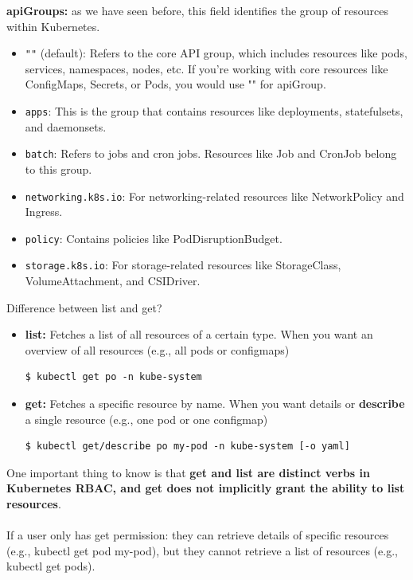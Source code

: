 \documentclass{article}
\newenvironment{blocktemplate}[1]{%
    \tcolorbox[beamer,%
    noparskip,breakable,
    colframe=Blue,%
    colbacklower=LimeGreen!75!LightGreen,%
    title=#1]}%
    {\endtcolorbox}
\newenvironment{codetemplate}[1][]{%
  \mybasecolorbox[#1]
  \itshape
}{%
  \endmybasecolorbox
}
\begin{document}
\textbf{apiGroups:} as we have seen before, this field identifies the group of resources within Kubernetes.
\begin{itemize}
    \item \verb|""| (default): Refers to the core API group, which includes resources like pods, services, namespaces, nodes, etc. If you're working with core resources like ConfigMaps, Secrets, or Pods, you would use "" for apiGroup.
    \item \verb|apps|: This is the group that contains resources like deployments, statefulsets, and daemonsets.
    \item \verb|batch|: Refers to jobs and cron jobs. Resources like Job and CronJob belong to this group.
    \item \verb|networking.k8s.io|: For networking-related resources like NetworkPolicy and Ingress.
    \item \verb|policy|: Contains policies like PodDisruptionBudget.
    \item \verb|storage.k8s.io|: For storage-related resources like StorageClass, VolumeAttachment, and CSIDriver.
\end{itemize}

\begin{blocktemplate}{NOTE}
Difference between list and get?
\begin{itemize}
    \item \textbf{list:} Fetches a list of all resources of a certain type. When you want an overview of all resources (e.g., all pods or configmaps)
\begin{codetemplate}{}
\begin{verbatim}
$ kubectl get po -n kube-system
\end{verbatim}
\end{codetemplate}
    \item \textbf{get:} Fetches a specific resource by name. When you want details or \textbf{describe} a single resource (e.g., one pod or one configmap)
\begin{codetemplate}{}
\begin{verbatim}
$ kubectl get/describe po my-pod -n kube-system [-o yaml]
\end{verbatim}
\end{codetemplate}
\end{itemize}

One important thing to know is that \textbf{get and list are distinct verbs in Kubernetes RBAC, and get does not implicitly grant the ability to list resources}.
\\\\
If a user only has get permission: they can retrieve details of specific resources (e.g., kubectl get pod my-pod), but they cannot retrieve a list of resources (e.g., kubectl get pods).
\end{blocktemplate}
\end{document}
